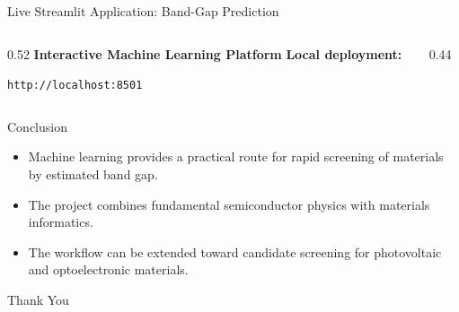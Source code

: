 \documentclass[aspectratio=169,11pt]{beamer}
\begin{document}
\begin{frame}{Live Streamlit Application: Band-Gap Prediction} 
	\begin{columns}[T]  
\begin{column}{0.52\textwidth} \textbf{Interactive Machine Learning Platform} 
			\vspace{0.2cm} \textbf{Local deployment:} 
		\begin{center} \Large \texttt{http://localhost:8501} \end{center} 
	\end{column}
		  \begin{column}{0.44\textwidth} 
 	\end{column} 
 \end{columns} 
\end{frame}
\begin{frame}{Conclusion}
\begin{itemize}
  \item Machine learning provides a practical route for rapid screening of materials by estimated band gap.
  \item The project combines fundamental semiconductor physics with materials informatics.
  \item The workflow can be extended toward candidate screening for photovoltaic and optoelectronic materials.
\end{itemize}

\vfill
\begin{center}
\Large Thank You
\end{center}
\end{frame}
\end{document}
